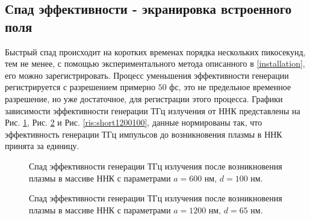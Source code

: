 \documentclass[a4paper,14pt,russian]{extreport}
\begin{document}
			\subsection{Спад эффективности - экранировка встроенного поля}
				Быстрый спад происходит на коротких временах порядка нескольких пикосекунд, тем не менее, с помощью экспериментального метода описанного в \ref{installation}, его можно зарегистрировать. Процесс уменьшения эффективности генерации регистрируется с разрешением примерно $50 \text{ фс}$, это не предельное временное разрешение, но уже достаточное, для регистрации этого процесса. Графики зависимости эффективности генерации ТГц излучения от ННК представлены на Рис. \ref{ris:short600100}, Рис. \ref{ris:short120065} и Рис. \ref{ris:short1200100}, данные нормированы так, что эффективность генерации ТГц импульсов до возникновения плазмы в ННК принята за единицу.\par
				\begin{figure}[h!]
					\caption{Спад эффективности генерации ТГц излучения после возникновения плазмы в массиве ННК с параметрами $a = 600 \text{ нм, } d = 100 \text{ нм}$.}
				\label{ris:short600100}
				\end{figure}
				\begin{figure}[h!]
					\caption{Спад эффективности генерации ТГц излучения после возникновения плазмы в массиве ННК с параметрами $a = 1200 \text{ нм, } d = 65 \text{ нм}$.}
				\label{ris:short120065}
				\end{figure}
\end{document}
